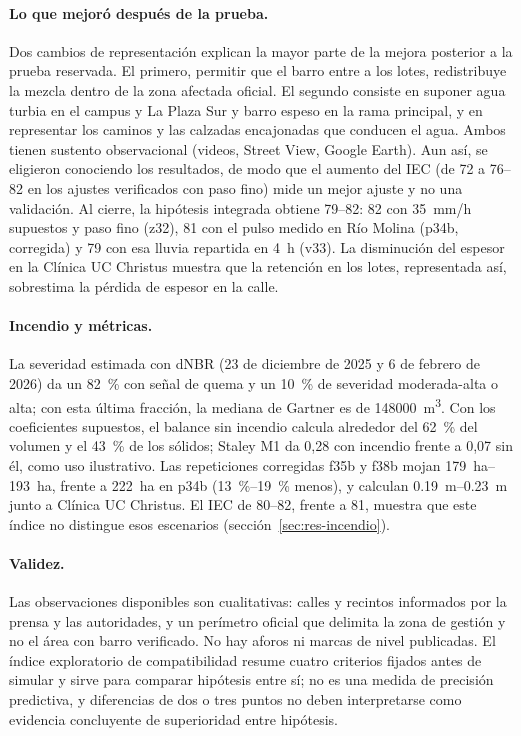 \paragraph{Lo que mejoró después de la prueba.} Dos cambios de representación explican la mayor parte de la mejora posterior a la prueba reservada. El primero, permitir que el barro entre a los lotes, redistribuye la mezcla dentro de la zona afectada oficial. El segundo consiste en suponer agua turbia en el campus y La Plaza Sur y barro espeso en la rama principal, y en representar los caminos y las calzadas encajonadas que conducen el agua. Ambos tienen sustento observacional (videos, Street View, Google Earth). Aun así, se eligieron conociendo los resultados, de modo que el aumento del IEC (de 72 a 76--82 en los ajustes verificados con paso fino) mide un mejor ajuste y no una validación. Al cierre, la hipótesis integrada obtiene 79--82: 82 con \SI{35}{mm/h} supuestos y paso fino (z32), 81 con el pulso medido en Río Molina (p34b, corregida) y 79 con esa lluvia repartida en \SI{4}{h} (v33). La disminución del espesor en la Clínica UC Christus muestra que la retención en los lotes, representada así, sobrestima la pérdida de espesor en la calle.

\paragraph{Incendio y métricas.} La severidad estimada con dNBR (23 de diciembre de 2025 y 6 de febrero de 2026) da un \SI{82}{\percent} con señal de quema y un \SI{10}{\percent} de severidad moderada-alta o alta; con esta última fracción, la mediana de Gartner es de \SI{148000}{m^3}. Con los coeficientes supuestos, el balance sin incendio calcula alrededor del \SI{62}{\percent} del volumen y el \SI{43}{\percent} de los sólidos; Staley M1 da 0,28 con incendio frente a 0,07 sin él, como uso ilustrativo. Las repeticiones corregidas f35b y f38b mojan \SIrange{179}{193}{ha}, frente a \SI{222}{ha} en p34b (\SIrange{13}{19}{\percent} menos), y calculan \SIrange{0,19}{0,23}{m} junto a Clínica UC Christus. El IEC de 80--82, frente a 81, muestra que este índice no distingue esos escenarios (sección~\ref{sec:res-incendio}).

\paragraph{Validez.} Las observaciones disponibles son cualitativas: calles y recintos informados por la prensa y las autoridades, y un perímetro oficial que delimita la zona de gestión y no el área con barro verificado. No hay aforos ni marcas de nivel publicadas. El índice exploratorio de compatibilidad resume cuatro criterios fijados antes de simular y sirve para comparar hipótesis entre sí; no es una medida de precisión predictiva, y diferencias de dos o tres puntos no deben interpretarse como evidencia concluyente de superioridad entre hipótesis.

